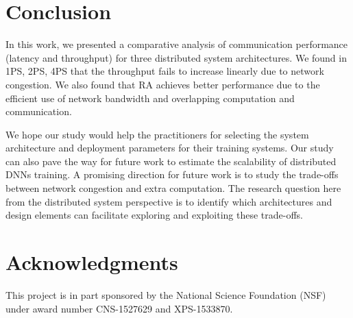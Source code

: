 \documentclass[conference]{IEEEtran}
\begin{document}
\section{Conclusion}
\label{sec:concl}

In this work, we presented a comparative analysis of communication performance (latency and throughput) for three distributed system architectures.  We found in 1PS, 2PS, 4PS that the throughput fails to increase linearly due to network congestion. We also found that RA achieves better performance due to the efficient use of network bandwidth and overlapping computation and communication. %

We hope our study would help the practitioners for selecting the system architecture and deployment parameters for their training systems. 
Our study can also pave the way for future work to estimate the scalability of distributed DNNs training. A promising direction for future work is to study the trade-offs between network congestion and extra computation. The research question here from the distributed system perspective is to identify which architectures and design elements can facilitate exploring and exploiting these trade-offs.

\section{Acknowledgments}
\label{sec:Acknow}

This project is in part sponsored by the National Science Foundation (NSF) under award number CNS-1527629 and XPS-1533870. 





%
\end{document}
